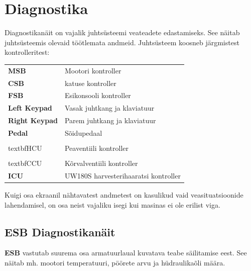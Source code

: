 \documentclass[12pt,a4paper,english]{uvmanual}
\begin{document}


\section{Diagnostika}\label{ch:system_diagnostics}

Diagnostikanäit on vajalik juhtsüsteemi veateadete edastamiseks. See näitab juhtsüsteemis olevaid töötlemata andmeid. Juhtsüsteem koosneb järgmistest kontrolleritest:

\begin{tabular}{ L{0.2\textwidth} L{0.66\textwidth} }
\textbf{MSB} & Mootori kontroller \\
\textbf{CSB} & katuse kontroller \\
\textbf{FSB} & Esikonsooli kontroller \\
\textbf{Left Keypad} & Vasak juhtkang ja klaviatuur \\
\textbf{Right Keypad} & Parem juhtkang ja klaviatuur \\
\textbf{Pedal} & Sõidupedaal \\
\\textbf{HCU} & Peaventiili kontroller \\
\\textbf{CCU} & Kõrvalventiili kontroller \\
\textbf{ICU} & UW180S harvesterihaaratsi kontroller \\
\end{tabular}




Kuigi osa ekraanil nähtavatest andmetest on kasulikud vaid veasituatsioonide lahendamisel, on osa neist vajaliku isegi kui masinas ei ole erilist viga.

\FloatBarrier
\subsection{ESB Diagnostikanäit}\label{ch:system_diagnostics_msb}


\textbf{ESB} vastutab suurema osa armatuurlaual kuvatava teabe säilitamise eest. See näitab mh. mootori temperatuuri, pöörete arvu ja hüdraulikaõli määra.
\end{document}
